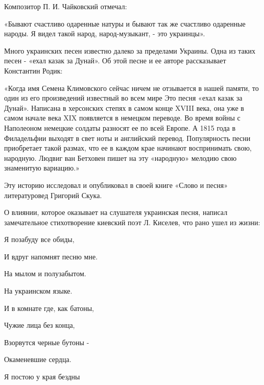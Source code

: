 Композитор П. И. Чайковский отмечал:



«Бывают счастливо одаренные натуры и бывают так же счастливо одаренные народы. Я видел такой народ, народ-музыкант, - это украинцы».



Много украинских песен известно далеко за пределами Украины. Одна из таких песен - «ехал казак за Дунай». Об этой песне и ее авторе рассказывает Константин Родик:



«Когда имя Семена Климовского сейчас ничем не отзывается в нашей памяти, то один из его произведений известный во всем мире Это песня «ехал казак за Дунай». Написана в херсонских степях в самом конце XVIII века, она уже в самом начале века XIX появляется в немецком переводе. Во время войны с Наполеоном немецкие солдаты разносят ее по всей Европе. А 1815 года в Филадельфии выходят в свет ноты и английский перевод. Популярность песни приобретает такой размах, что ее в каждом крае начинают воспринимать свою, народную. Людвиг ван Бетховен пишет на эту «народную» мелодию свою знаменитую вариацию.»



Эту историю исследовал и опубликовал в своей книге «Слово и песня» литературовед Григорий Скука.



О влиянии, которое оказывает на слушателя украинская песня, написал замечательное стихотворение киевский поэт Л. Киселев, что рано ушел из жизни:



Я позабуду все обиды,



И вдруг напомнят песню мне.



На мылом и полузабытом.



На украинском языке.



И в комнате где, как батоны,



Чужие лица без конца,



Взорвутся черные бутоны -



Окаменевшие сердца.



Я постою у края бездны



